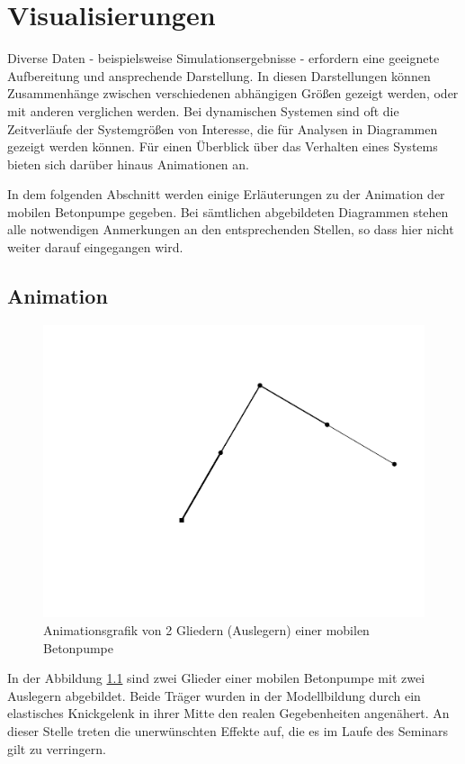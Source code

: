 \chapter{Visualisierungen} \label{ch:Visualisierung}

Diverse Daten - beispielsweise Simulationsergebnisse - erfordern eine geeignete Aufbereitung und ansprechende Darstellung. In diesen Darstellungen können Zusammenhänge zwischen verschiedenen abhängigen Größen gezeigt werden, oder mit anderen verglichen werden.
Bei dynamischen Systemen sind oft die Zeitverläufe der Systemgrößen von Interesse, die für Analysen in Diagrammen gezeigt werden können. Für einen Überblick über das Verhalten eines Systems bieten sich darüber hinaus Animationen an.

In dem folgenden Abschnitt werden einige Erläuterungen zu der Animation der mobilen Betonpumpe gegeben. Bei sämtlichen abgebildeten Diagrammen stehen alle notwendigen Anmerkungen an den entsprechenden Stellen, so dass hier nicht weiter darauf eingegangen wird.

\section{Animation}

\begin{figure}[h]
\centering
\includegraphics[width=0.7\linewidth]{animation01}
\caption[Animation Betonpumpe]{Animationsgrafik von 2 Gliedern (Auslegern) einer mobilen Betonpumpe}
\label{fig:animation}
\end{figure}

In der Abbildung \ref{fig:animation} sind zwei Glieder einer mobilen Betonpumpe mit zwei Auslegern abgebildet. Beide Träger wurden in der Modellbildung durch ein elastisches Knickgelenk in ihrer Mitte den realen Gegebenheiten angenähert. An dieser Stelle treten die unerwünschten Effekte auf, die es im Laufe des Seminars gilt zu verringern. 
